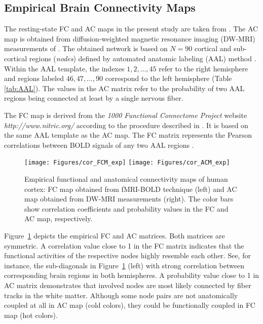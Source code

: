 \documentclass[fleqn,10pt]{wlpeerj}
\begin{document}
\subsection*{Empirical Brain Connectivity Maps}
The resting-state FC and AC maps in the present study are taken from \cite{VUK14}. The AC map is obtained
from diffusion-weighted magnetic resonance imaging (DW-MRI) measurements of \cite{ITU08}. The obtained network is based
on $N=90$ cortical and sub-cortical regions (\textit{nodes}) defined by automated anatomic labeling (AAL) method
\citep{TZO02}. Within the AAL template, the indexes $1, 2, \dots ,45$ refer to the right hemisphere  and regions labeled
$46,47, \dots ,90$ correspond to the left hemisphere (Table \ref{tab:AAL}). The values in the AC matrix refer to the
probability of two AAL regions being connected at least by a single nervous fiber. 

The FC map is derived from the \textit{1000 Functional Connectome Project} website \textit{http://www.nitric.org/} according to the procedure described in \cite{VUK14}. It is based on the same AAL template as the AC map. The FC matrix represents the Pearson correlations between BOLD signals of any two AAL regions \citep{MARG07, VUK14}.

\begin{figure}[ht]\centering
 \texttt{[image: Figures/cor\_FCM\_exp]} 
 \texttt{[image: Figures/cor\_ACM\_exp]} 
 \caption{Empirical functional and anatomical connectivity maps of human cortex: FC map obtained from fMRI-BOLD
technique (left) and AC map obtained from DW-MRI measurements (right). The color bars show correlation coefficients and
probability values in the FC and AC map, respectively.}
\label{fig:Empirical FCM and ACM}
\end{figure}

Figure~\ref{fig:Empirical FCM and ACM} depicts the empirical FC and AC matrices.
Both matrices are symmetric. A
correlation value close to 1 in the FC matrix indicates that the functional activities of the respective nodes
highly resemble each other. See, for instance, the sub-diagonals in Figure~\ref{fig:Empirical FCM and ACM} (left) with
strong correlation between corresponding brain regions in both hemispheres. A probability value
close to 1 in AC matrix demonstrates that involved nodes are most likely connected by fiber tracks in the white
matter. Although some node pairs are not anatomically coupled at all in AC map (cold colors), they could be functionally
coupled in FC map (hot colors).
\end{document}
